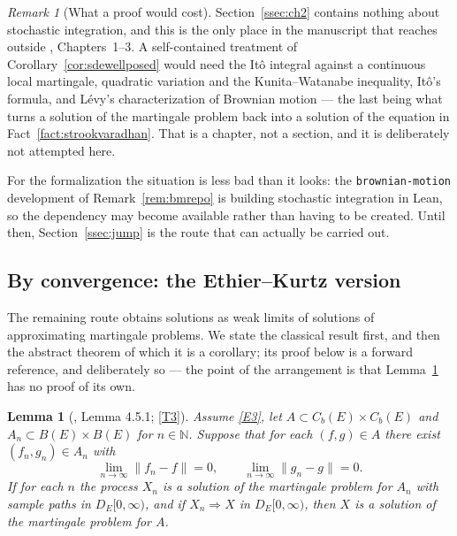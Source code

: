 \documentclass[11pt,a4paper]{article}
\theoremstyle{plain}
\newtheorem{lemma}[theorem]{Lemma}
\theoremstyle{definition}
\theoremstyle{remark}
\newtheorem{remark}[theorem]{Remark}
\newcommand{\N}{\mathbb{N}}
\newcommand{\Bdd}{B}                           %
\newcommand{\Cb}{C_b}                          %
\newcommand{\DE}{D_E[0,\infty)}
\DeclareMathOperator*{\wto}{\Rightarrow}
\newcommand{\EK}{\cite{EK86}}
\begin{document}
\begin{remark}[What a proof would cost]
  \label{rem:sdecost}
  Section~\ref{ssec:ch2} contains nothing about stochastic integration, and this
  is the only place in the manuscript that reaches outside \EK, Chapters~1--3.  A
  self-contained treatment of Corollary~\ref{cor:sdewellposed} would need the
  It\^o integral against a continuous local martingale, quadratic variation and
  the Kunita--Watanabe inequality, It\^o's formula, and L\'evy's characterization
  of Brownian motion --- the last being what turns a solution of the martingale
  problem back into a solution of the equation in Fact~\ref{fact:strookvaradhan}.
  That is a chapter, not a section, and it is deliberately not attempted here.

  For the formalization the situation is less bad than it looks: the
  \texttt{brownian-motion} development of Remark~\ref{rem:bmrepo} is building
  stochastic integration in Lean, so the dependency may become available rather
  than having to be created.  Until then, Section~\ref{ssec:jump} is the route
  that can actually be carried out.
\end{remark}

\subsection{By convergence: the Ethier--Kurtz version}
\label{ssec:EKconv}

The remaining route obtains solutions as weak limits of solutions of approximating
martingale problems.  We state the classical result first, and then the abstract
theorem of which it is a corollary; its proof below is a forward reference, and
deliberately so --- the point of the arrangement is that
Lemma~\ref{lem:EKconv} has no proof of its own.


\begin{lemma}[\EK, Lemma 4.5.1; \eqref{T3}]
  \label{lem:EKconv}
  Assume \eqref{E3}, let $A \subset \Cb(E) \times \Cb(E)$ and
  $A_n \subset \Bdd(E) \times \Bdd(E)$ for $n \in \N$.  Suppose that for each
  $(f,g) \in A$ there exist $(f_n,g_n) \in A_n$ with
  \begin{equation}
    \label{eq:approxA}
    \lim_{n \to \infty} \lVert f_n - f \rVert = 0,
    \qquad
    \lim_{n \to \infty} \lVert g_n - g \rVert = 0 .
  \end{equation}
  If for each $n$ the process $X_n$ is a solution of the martingale problem for
  $A_n$ with sample paths in $\DE$, and if $X_n \wto X$ in $\DE$, then $X$ is a
  solution of the martingale problem for $A$.
\end{lemma}
\end{document}
